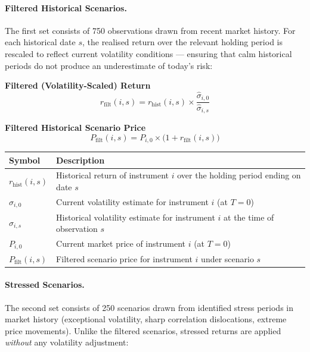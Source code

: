 \documentclass[9pt, a4paper]{extarticle}
\newenvironment{formulabox}{\par\addvspace{4pt}}{\par\addvspace{4pt}}
\newcommand{\vartableheader}{%
    \textbf{Symbol} & \textbf{Description}\\
}
\begin{document}
\paragraph{Filtered Historical Scenarios.}
The first set consists of 750 observations drawn from recent market history.
For each historical date $s$, the realised return over the relevant holding
period is rescaled to reflect current volatility conditions — ensuring that
calm historical periods do not produce an underestimate of today's risk:

\begin{formulabox}
\textbf{Filtered (Volatility-Scaled) Return}
\begin{equation*}
    r_{\mathrm{filt}}(i,s)
        = r_{\mathrm{hist}}(i,s)
          \times \frac{\hat{\sigma}_{i,0}}{\hat{\sigma}_{i,s}}
\end{equation*}
\end{formulabox}

\begin{formulabox}
\textbf{Filtered Historical Scenario Price}
\begin{equation*}
    P_{\mathrm{filt}}(i,s)
        = P_{i,0} \times \bigl(1 + r_{\mathrm{filt}}(i,s)\bigr)
\end{equation*}
\end{formulabox}

\begin{tabularx}{\linewidth}{lX}
\toprule
\vartableheader
\midrule
$r_{\mathrm{hist}}(i,s)$   & Historical return of instrument $i$ over the holding period ending on date $s$ \\
$\hat{\sigma}_{i,0}$        & Current volatility estimate for instrument $i$ (at $T=0$) \\
$\hat{\sigma}_{i,s}$        & Historical volatility estimate for instrument $i$ at the time of observation $s$ \\
$P_{i,0}$                   & Current market price of instrument $i$ (at $T=0$) \\
$P_{\mathrm{filt}}(i,s)$   & Filtered scenario price for instrument $i$ under scenario $s$ \\
\bottomrule
\end{tabularx}

\paragraph{Stressed Scenarios.}
The second set consists of 250 scenarios drawn from identified stress periods in
market history (exceptional volatility, sharp correlation dislocations, extreme
price movements). Unlike the filtered scenarios, stressed returns are applied
\emph{without} any volatility adjustment:
\end{document}
